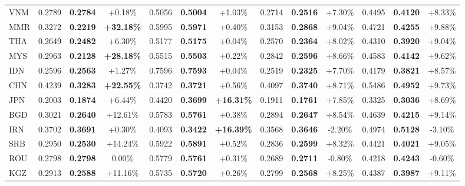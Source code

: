 \documentclass{article}
\providecommand{\gain}{}\renewcommand{\gain}[1]{\textcolor{improvegreen}{#1}}
\providecommand{\loss}{}\renewcommand{\loss}[1]{\textcolor{worsered}{#1}}
\begin{document}
\begin{table}[H]
{\begin{tabular}{l ccc ccc ccc ccc}
VNM & 0.2789 & \textbf{0.2784} & \gain{+0.18\%} & 0.5056 & \textbf{0.5004} & \gain{+1.03\%} & 0.2714 & \textbf{0.2516} & \gain{+7.30\%} & 0.4495 & \textbf{0.4120} & \gain{+8.33\%} \\
MMR & 0.3272 & \textbf{0.2219} & \gain{\textbf{+32.18\%}} & 0.5995 & \textbf{0.5971} & \gain{+0.40\%} & 0.3153 & \textbf{0.2868} & \gain{+9.04\%} & 0.4721 & \textbf{0.4255} & \gain{+9.88\%} \\
THA & 0.2649 & \textbf{0.2482} & \gain{+6.30\%} & 0.5177 & \textbf{0.5175} & \gain{+0.04\%} & 0.2570 & \textbf{0.2364} & \gain{+8.02\%} & 0.4310 & \textbf{0.3920} & \gain{+9.04\%} \\
MYS & 0.2963 & \textbf{0.2128} & \gain{\textbf{+28.18\%}} & 0.5515 & \textbf{0.5503} & \gain{+0.22\%} & 0.2842 & \textbf{0.2596} & \gain{+8.66\%} & 0.4583 & \textbf{0.4142} & \gain{+9.62\%} \\
IDN & 0.2596 & \textbf{0.2563} & \gain{+1.27\%} & 0.7596 & \textbf{0.7593} & \gain{+0.04\%} & 0.2519 & \textbf{0.2325} & \gain{+7.70\%} & 0.4179 & \textbf{0.3821} & \gain{+8.57\%} \\
CHN & 0.4239 & \textbf{0.3283} & \gain{\textbf{+22.55\%}} & 0.3742 & \textbf{0.3721} & \gain{+0.56\%} & 0.4097 & \textbf{0.3740} & \gain{+8.71\%} & 0.5486 & \textbf{0.4952} & \gain{+9.73\%} \\
JPN & 0.2003 & \textbf{0.1874} & \gain{+6.44\%} & 0.4420 & \textbf{0.3699} & \gain{\textbf{+16.31\%}} & 0.1911 & \textbf{0.1761} & \gain{+7.85\%} & 0.3325 & \textbf{0.3036} & \gain{+8.69\%} \\
BGD & 0.3021 & \textbf{0.2640} & \gain{+12.61\%} & 0.5783 & \textbf{0.5761} & \gain{+0.38\%} & 0.2894 & \textbf{0.2647} & \gain{+8.54\%} & 0.4639 & \textbf{0.4215} & \gain{+9.14\%} \\
IRN & 0.3702 & \textbf{0.3691} & \gain{+0.30\%} & 0.4093 & \textbf{0.3422} & \gain{\textbf{+16.39\%}} & 0.3568 & \textbf{0.3646} & \loss{-2.20\%} & 0.4974 & \textbf{0.5128} & \loss{-3.10\%} \\
SRB & 0.2950 & \textbf{0.2530} & \gain{+14.24\%} & 0.5922 & \textbf{0.5891} & \gain{+0.52\%} & 0.2836 & \textbf{0.2599} & \gain{+8.32\%} & 0.4421 & \textbf{0.4021} & \gain{+9.05\%} \\
ROU & 0.2798 & \textbf{0.2798} & 0.00\% & 0.5779 & \textbf{0.5761} & \gain{+0.31\%} & 0.2689 & \textbf{0.2711} & \loss{-0.80\%} & 0.4218 & \textbf{0.4243} & \loss{-0.60\%} \\
KGZ & 0.2913 & \textbf{0.2588} & \gain{+11.16\%} & 0.5735 & \textbf{0.5720} & \gain{+0.26\%} & 0.2799 & \textbf{0.2568} & \gain{+8.25\%} & 0.4387 & \textbf{0.3987} & \gain{+9.11\%} \\

\end{tabular}}
\end{table}
\end{document}
